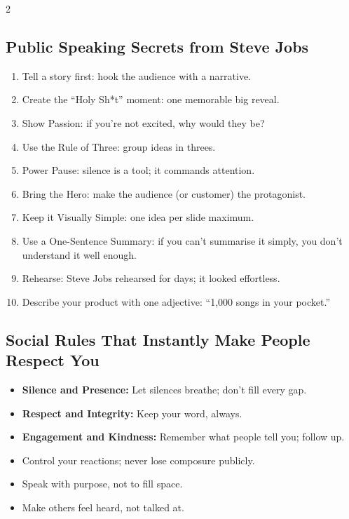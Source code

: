 \documentclass[10pt,a4paper]{article}
\begin{document}
\begin{multicols}{2}
\subsection{Public Speaking Secrets from Steve Jobs}
\begin{enumerate}
\item Tell a story first: hook the audience with a narrative.
\item Create the ``Holy Sh*t'' moment: one memorable big reveal.
\item Show Passion: if you're not excited, why would they be?
\item Use the Rule of Three: group ideas in threes.
\item Power Pause: silence is a tool; it commands attention.
\item Bring the Hero: make the audience (or customer) the protagonist.
\item Keep it Visually Simple: one idea per slide maximum.
\item Use a One-Sentence Summary: if you can't summarise it simply, you don't understand it well enough.
\item Rehearse: Steve Jobs rehearsed for days; it looked effortless.
\item Describe your product with one adjective: ``1,000 songs in your pocket.''
\end{enumerate}

\subsection{Social Rules That Instantly Make People Respect You}
\begin{itemize}
\item \textbf{Silence and Presence:} Let silences breathe; don't fill every gap.
\item \textbf{Respect and Integrity:} Keep your word, always.
\item \textbf{Engagement and Kindness:} Remember what people tell you; follow up.
\item Control your reactions; never lose composure publicly.
\item Speak with purpose, not to fill space.
\item Make others feel heard, not talked at.
\end{itemize}


\end{multicols}
\end{document}
